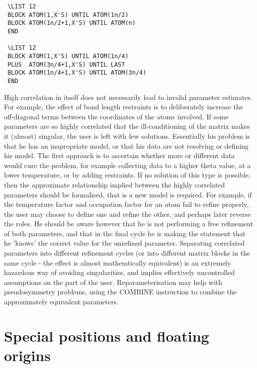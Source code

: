 \documentclass[10pt,a4paper]{report}
\begin{document}
\small\begin{verbatim}
 \LIST 12
 BLOCK ATOM(1,X'S) UNTIL ATOM(1n/2)
 BLOCK ATOM(1n/2+1,X'S) UNTIL ATOM(n)
 END
 
 \LIST 12
 BLOCK ATOM(1,X'S) UNTIL ATOM(1n/4)
 PLUS  ATOM(3n/4+1,X'S) UNTIL LAST
 BLOCK ATOM(1n/4+1,X'S) UNTIL ATOM(3n/4)
 END
\end{verbatim}\normalsize




\bigskip{}




 High correlation in itself does not necessarily lead to invalid
 parameter estimates. For example, the effect of bond length restraints is
 to deliberately increase the off-diagonal terms between the coordinates
 of the atoms involved. If some parameters are so highly correlated that
 the ill-conditioning of the matrix makes it (almost) singular, the user is
 left with few solutions. Essentially his problem is that he has an 
 inapropriate model, or that his data are not resolving or defining his model.
 The first approach is to ascertain whether more or different
 data would cure the problem, for example collecting data to a higher theta
 value, at a lower temperature, or by adding restraints. If no solution
 of this type is possible, then the approximate relationship implied
 between the highly correlated parameters should be formalised, that is
 a new model is required. For example, if the temperature factor and 
 occupation factor for an atom fail to refine properly, the user may choose
 to define one and refine the other, and perhaps later reverse the roles.
 He should be aware however that he is not performing a free refinement of
 both parameters, and that in the final cycle he is making the statement
 that he 'knows' the correct value for the unrefined parameter. Separating
 correlated parameters into different refinement cycles (or into different
 matrix blocks in the same cycle - the effect is almost mathemtically
 equivalent) is an extremely hazardous way of avoiding singularities, and
 implies effectively uncontrolled assumptions on the part of the user. 
 Reparameterisation may help with pseudosymmetry problems, using the COMBINE
 instruction to combine the approximately equivalent parameters.



\section{Special positions and floating origins}
\end{document}
